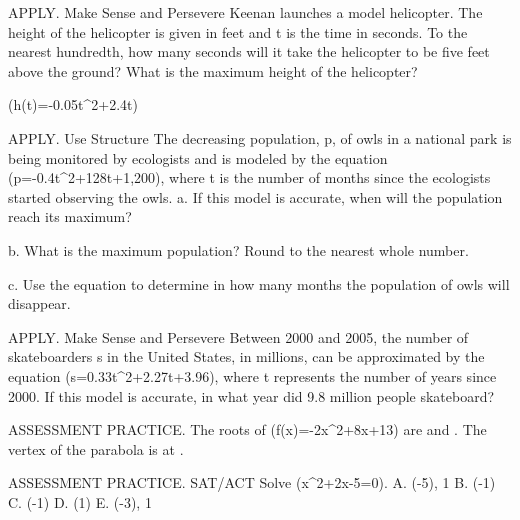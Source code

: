 \documentclass{article}
\newenvironment{practice}[2]{}{}        %
\newcommand{\answer}[1]{}               %
\newcommand{\placeholder}[2]{}          %
\newcommand{\uncertain}[2]{#1}          %
\newcommand{\te}[1]{}                   %
\begin{document}
\begin{practice}{49}{2}
APPLY. Make Sense and Persevere Keenan launches a model helicopter. The height of the helicopter is given in feet and t is the time in seconds. To the nearest hundredth, how many seconds will it take the helicopter to be five feet above the ground? What is the maximum height of the helicopter?
\placeholder{illustration}{Keenan in a green field holding a remote control, flying a yellow model helicopter; equation callout h(t)=-0.05t squared+2.4t.}
(h(t)=-0.05t^2+2.4t)
\answer{about 2.18 seconds and 45.82 seconds; 28.8 feet}
\end{practice}
\begin{practice}{50}{2}
APPLY. Use Structure The decreasing population, p, of owls in a national park is being monitored by ecologists and is modeled by the equation (p=-0.4t^2+128t+1,200), where t is the number of months since the ecologists started observing the owls.
a. If this model is accurate, when will the population reach its maximum?
\answer{160 months}
b. What is the maximum population? Round to the nearest whole number.
\answer{11,440 owls}
c. Use the equation to determine in how many months the population of owls will disappear.
\answer{329.1 months}
\te{Printed description says decreasing population; the stated model initially increases until month 160.}
\end{practice}
\begin{practice}{51}{2}
APPLY. Make Sense and Persevere Between 2000 and 2005, the number of skateboarders s in the United States, in millions, can be approximated by the equation (s=0.33t^2+2.27t+3.96), where t represents the number of years since 2000. If this model is accurate, in what year did 9.8 million people skateboard?
\answer{2002}
\end{practice}
\begin{practice}{52}{1}
ASSESSMENT PRACTICE. The roots of (f(x)=-2x^2+8x+13) are \underline{\hspace{2em}} and \underline{\hspace{2em}}. The vertex of the parabola is at \underline{\hspace{2em}}.
\answer{(-1.24), 5.24, (2,21)}
\end{practice}
\begin{practice}{53}{1}
ASSESSMENT PRACTICE. SAT/ACT Solve (x^2+2x-5=0).
A. (-5), 1
B. (-1\pm{})
C. (-1\pm{})
D. (1\pm{})
E. (-3), 1
\answer{C}
\te{DOK \uncertain{1}{not printed; item omitted from Item Analysis}.}
\end{practice}
\end{document}
